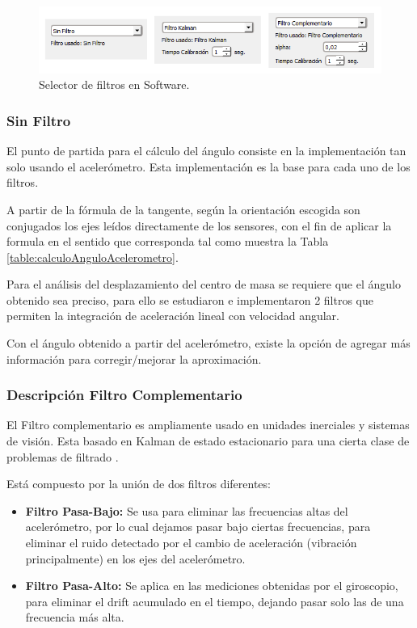 \documentclass[12pt,a4paper]{article}
\begin{document}
\begin{figure}[H]
\centering
	\includegraphics[scale=0.9]{images/implementacionFiltros}
	\caption{Selector de filtros en Software.}
\label{fig:selectorFiltros}
\end{figure}

\subsubsection{Sin Filtro} El punto de partida para el cálculo del ángulo consiste en la implementación tan solo usando el acelerómetro. Esta implementación es la base para cada uno de los filtros.

A partir de la fórmula de la tangente, según la orientación escogida son conjugados los ejes leídos directamente de los sensores, con el fin de aplicar la formula en el sentido que corresponda tal como muestra la Tabla \ref{table:calculoAnguloAcelerometro}.


Para el análisis del desplazamiento del centro de masa se requiere que el ángulo obtenido sea preciso, para ello se estudiaron e implementaron 2 filtros que permiten la integración de aceleración lineal con velocidad angular.

Con el ángulo obtenido a partir del acelerómetro, existe la opción de agregar más información para corregir/mejorar la aproximación.


\subsubsection{Descripción Filtro Complementario}
El Filtro complementario es ampliamente usado en unidades inerciales y sistemas de visión. Esta basado en Kalman de estado estacionario para una cierta clase de problemas de filtrado \cite{TesisUSM}.

Está compuesto por la unión de dos filtros diferentes:
\begin{itemize}
	\item \textbf{Filtro Pasa-Bajo:} Se usa para eliminar las frecuencias altas del acelerómetro, por lo cual dejamos pasar bajo ciertas frecuencias, para eliminar el ruido detectado por el cambio de aceleración (vibración principalmente) en los ejes del acelerómetro.
	\item \textbf{Filtro Pasa-Alto:} Se aplica en las mediciones obtenidas por el giroscopio, para eliminar el drift acumulado en el tiempo, dejando pasar solo las de una frecuencia más alta.
\end{itemize}
\end{document}
